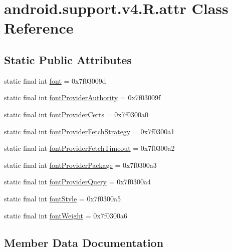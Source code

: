 \hypertarget{classandroid_1_1support_1_1v4_1_1R_1_1attr}{}\section{android.\+support.\+v4.\+R.\+attr Class Reference}
\label{classandroid_1_1support_1_1v4_1_1R_1_1attr}
\subsection*{Static Public Attributes}
\begin{DoxyCompactItemize}
\item 
static final int \mbox{\hyperlink{classandroid_1_1support_1_1v4_1_1R_1_1attr_a784b971c7ce1ca8f41748ba7abcc48f5}{font}} = 0x7f03009d
\item 
static final int \mbox{\hyperlink{classandroid_1_1support_1_1v4_1_1R_1_1attr_a315bbcf1c1ea5d256a8db20f7cc269b5}{font\+Provider\+Authority}} = 0x7f03009f
\item 
static final int \mbox{\hyperlink{classandroid_1_1support_1_1v4_1_1R_1_1attr_a4c9ba6ad273014bef1bbed0c4ad3b424}{font\+Provider\+Certs}} = 0x7f0300a0
\item 
static final int \mbox{\hyperlink{classandroid_1_1support_1_1v4_1_1R_1_1attr_aa059957b6096ff95f22eff9f881656aa}{font\+Provider\+Fetch\+Strategy}} = 0x7f0300a1
\item 
static final int \mbox{\hyperlink{classandroid_1_1support_1_1v4_1_1R_1_1attr_a9806e07c1ba436a8defba42227ff108e}{font\+Provider\+Fetch\+Timeout}} = 0x7f0300a2
\item 
static final int \mbox{\hyperlink{classandroid_1_1support_1_1v4_1_1R_1_1attr_a162f73d436f42bce7e1ad651ebc93de9}{font\+Provider\+Package}} = 0x7f0300a3
\item 
static final int \mbox{\hyperlink{classandroid_1_1support_1_1v4_1_1R_1_1attr_a7cbc384b3e4af24b660c51241bb88b2f}{font\+Provider\+Query}} = 0x7f0300a4
\item 
static final int \mbox{\hyperlink{classandroid_1_1support_1_1v4_1_1R_1_1attr_a74882a15e37dacc0f0599dabe554eb82}{font\+Style}} = 0x7f0300a5
\item 
static final int \mbox{\hyperlink{classandroid_1_1support_1_1v4_1_1R_1_1attr_a26d39aee68d62f1d658b6bdff21fbc76}{font\+Weight}} = 0x7f0300a6
\end{DoxyCompactItemize}


\subsection{Member Data Documentation}
\mbox{\label{classandroid_1_1support_1_1v4_1_1R_1_1attr_a784b971c7ce1ca8f41748ba7abcc48f5}} 
